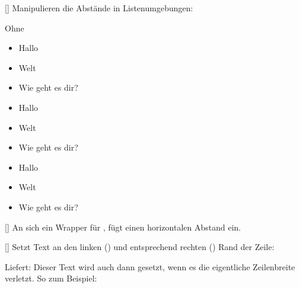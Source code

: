 %
%
%

[\cmdlist{}]
Manipulieren die Abstände in Listenumgebungen:
\begin{center}
    \parbox{0.33\linewidth}{%
        {\centering Ohne \par}
        {\begin{itemize}
            \item Hallo
            \item Welt
            \item Wie geht es dir?
        \end{itemize}}
    }\parbox{0.33\linewidth}{%
        {\centering {} \par}
        {\begin{itemize}\narrowitems
            \item Hallo
            \item Welt
            \item Wie geht es dir?
        \end{itemize}}
    }\parbox{0.33\linewidth}{%
        {\centering {} \par}
        {\begin{itemize}\closeritems
            \item Hallo
            \item Welt
            \item Wie geht es dir?
        \end{itemize}}
    }
\end{center}

%
%
%

[]
An sich ein Wrapper für , fügt einen horizontalen \tab Abstand ein.

%
%
%

[\cmdold]
Setzt Text an den linken () und entsprechend rechten () Rand der Zeile:
\begin{latex*}
\end{latex*}
Liefert:\newline{}\newline
Dieser Text wird auch dann gesetzt, wenn es die eigentliche Zeilenbreite verletzt. \newline
So zum Beispiel:

